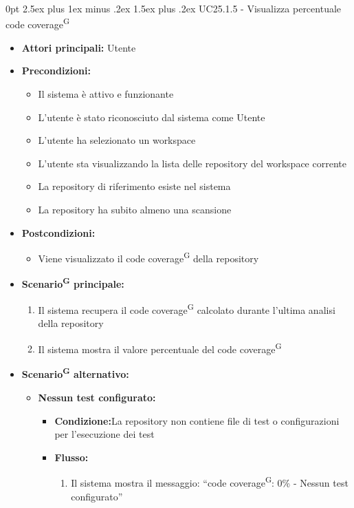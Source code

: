 \documentclass[a4paper, 11pt]{article}
\makeatletter
\renewcommand\paragraph{\@startsection{paragraph}{4}
  {0pt}
  {2.5ex plus 1ex minus .2ex}
  {1.5ex plus .2ex}
  {\normalfont\normalsize\bfseries\color{AccentDark}}}
\makeatother
\begin{document}
\paragraph{UC25.1.5 - Visualizza percentuale code coverage\textsuperscript{G}} \label{UC25.1.5}
\begin{itemize}
	\item \textbf{Attori principali:} Utente
	\item \textbf{Precondizioni:}
	\begin{itemize}
		\item Il sistema è attivo e funzionante
		\item L'utente è stato riconosciuto dal sistema come Utente
		\item L'utente ha selezionato un workspace
		\item L'utente sta visualizzando la lista delle repository del workspace corrente
		\item La repository di riferimento esiste nel sistema
		\item La repository ha subito almeno una scansione
	\end{itemize}
	\item \textbf{Postcondizioni:}
	\begin{itemize}
		\item Viene visualizzato il code coverage\textsuperscript{G} della repository
	\end{itemize}
	\item \textbf{Scenario\textsuperscript{G} principale:}
	\begin{enumerate}
		\item Il sistema recupera il code coverage\textsuperscript{G} calcolato durante l'ultima analisi della repository
		\item Il sistema mostra il valore percentuale del code coverage\textsuperscript{G}
	\end{enumerate}
		\item \textbf{Scenario\textsuperscript{G} alternativo:}
	\begin{itemize}
		\item \textbf{Nessun test configurato:}
			\begin{itemize}
				\item \textbf{Condizione:}La repository non contiene file di test o configurazioni per l'esecuzione dei test
				\item \textbf{Flusso:}
				\begin{enumerate}
					\item Il sistema mostra il messaggio: “code coverage\textsuperscript{G}: 0\% - Nessun test configurato”

\end{enumerate}
\end{itemize}
\end{itemize}
\end{itemize}
\end{document}
